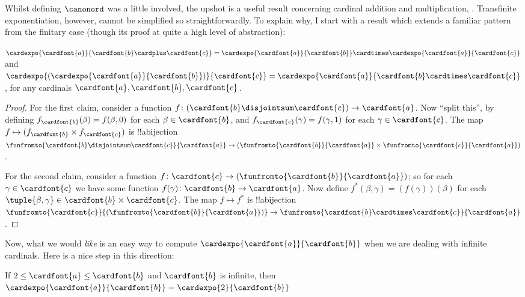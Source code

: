 \documentclass[../../../include/open-logic-section]{subfiles}
\begin{document}
Whilst defining $\canonord$ was a little involved, the upshot is a useful result concerning cardinal addition and multiplication, . Transfinite exponentiation, however, cannot be simplified so straightforwardly. To explain why, I start with a result which extends a familiar pattern from the finitary case (though its proof  at quite a high level of abstraction):
\begin{prop}
$\cardexpo{\cardfont{a}}{\cardfont{b} \cardplus \cardfont{c}} = \cardexpo{\cardfont{a}}{\cardfont{b}} \cardtimes \cardexpo{\cardfont{a}}{\cardfont{c}}$ and $\cardexpo{(\cardexpo{\cardfont{a}}{\cardfont{b}})}{\cardfont{c}} = \cardexpo{\cardfont{a}}{\cardfont{b} \cardtimes \cardfont{c}}$, for any cardinals $\cardfont{a}, \cardfont{b}, \cardfont{c}$.
\end{prop}
\begin{proof}
	For the first claim, consider a function $f \colon (\cardfont{b}\disjointsum\cardfont{c}) \to \cardfont{a}$. Now ``split this'', by defining $f_\cardfont{b}(\beta) = f(\beta, 0)$ for each $\beta \in \cardfont{b}$, and $f_\cardfont{c}(\gamma) = f(\gamma, 1)$ for each $\gamma \in \cardfont{c}$. The map $f \mapsto (f_{\cardfont{b}} \times f_\cardfont{c})$ is !!a{bijection} $\funfromto{\cardfont{b} \disjointsum \cardfont{c}}{\cardfont{a}} \to (\funfromto{\cardfont{b}}{\cardfont{a}} \times \funfromto{\cardfont{c}}{\cardfont{a}})$. 
	
	For the second claim, consider a function $f \colon \cardfont{c} \to (\funfromto{\cardfont{b}}{\cardfont{a}})$; so for each $\gamma \in \cardfont{c}$ we have some function $f(\gamma) \colon \cardfont{b} \to \cardfont{a}$. Now define $f^*(\beta, \gamma) = (f(\gamma))(\beta)$ for each $\tuple{\beta, \gamma} \in \cardfont{b} \times \cardfont{c}$. The map $f \mapsto f^*$ is !!a{bijection} $\funfromto{\cardfont{c}}{(\funfromto{\cardfont{b}}{\cardfont{a}})} \to \funfromto{\cardfont{b} \cardtimes \cardfont{c}}{\cardfont{a}}$. 
\end{proof}\noindent
Now, what we would \emph{like} is an easy way to compute $\cardexpo{\cardfont{a}}{\cardfont{b}}$ when we are dealing with infinite cardinals. Here is a nice step in this direction:
\begin{prop}
	If $2 \leq \cardfont{a} \leq \cardfont{b}$ and $\cardfont{b}$ is infinite, then $\cardexpo{\cardfont{a}}{\cardfont{b}} = \cardexpo{2}{\cardfont{b}}$
\end{prop}
\end{document}
